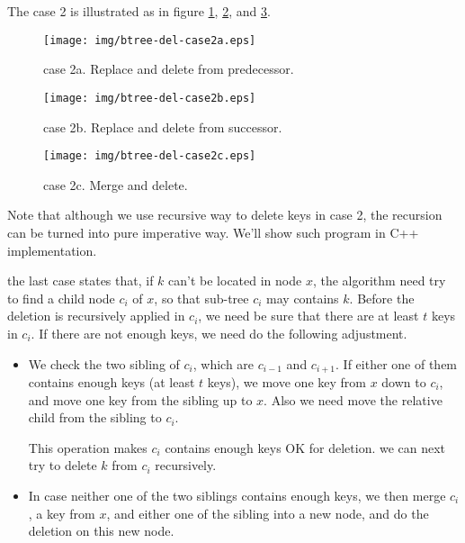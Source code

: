\documentclass{article}
\begin{document}
The case 2 is illustrated as in figure \ref{fig:btree-del-case2a},
\ref{fig:btree-del-case2b}, and \ref{fig:btree-del-case2c}.

\begin{figure}[htbp]
  \begin{center}
    \texttt{[image: img/btree-del-case2a.eps]}
    \caption{case 2a. Replace and delete from predecessor.} \label{fig:btree-del-case2a}
  \end{center}
\end{figure}

\begin{figure}[htbp]
  \begin{center}
    \texttt{[image: img/btree-del-case2b.eps]}
    \caption{case 2b. Replace and delete from successor.} \label{fig:btree-del-case2b}
  \end{center}
\end{figure}

\begin{figure}[htbp]
  \begin{center}
    \texttt{[image: img/btree-del-case2c.eps]}
    \caption{case 2c. Merge and delete.} \label{fig:btree-del-case2c}
  \end{center}
\end{figure}

Note that although we use recursive way to delete keys in case 2, the
recursion can be turned into pure imperative way. We'll show such
program in C++ implementation.

the last case states that, if $k$ can't be located in node $x$, the algorithm
need try to find a child node $c_i$ of $x$, so that sub-tree $c_i$ may
contains $k$. Before the deletion is recursively applied in $c_i$, we
need be sure that there are at least $t$ keys in $c_i$. If there are
not enough keys, we need do the following adjustment.

\begin{itemize}
\item We check the two sibling of $c_i$, which are $c_{i-1}$ and $c_{i+1}$.
If either one of them contains enough keys (at least $t$ keys), we move
one key from $x$ down to $c_i$, and move one key from the sibling up to
$x$. Also we need move the relative child from the sibling to $c_i$.

This operation makes $c_i$ contains enough keys OK for deletion. we can
next try to delete $k$ from $c_i$ recursively.

\item In case neither one of the two siblings contains enough keys, we then
merge $c_i$, a key from $x$, and either one of the sibling into a new
node, and do the deletion on this new node.
\end{itemize}
\end{document}

